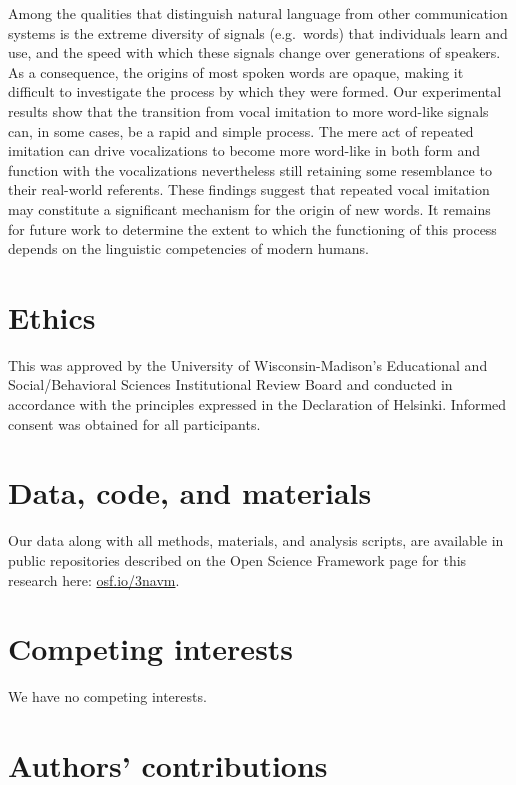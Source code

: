 \documentclass[english,floatsintext,man]{apa6}
\theoremstyle{definition}
\theoremstyle{definition}
\theoremstyle{definition}
\theoremstyle{remark}
\begin{document}
Among the qualities that distinguish natural language from other
communication systems is the extreme diversity of signals (e.g.~words)
that individuals learn and use, and the speed with which these signals
change over generations of speakers. As a consequence, the origins of
most spoken words are opaque, making it difficult to investigate the
process by which they were formed. Our experimental results show that
the transition from vocal imitation to more word-like signals can, in
some cases, be a rapid and simple process. The mere act of repeated
imitation can drive vocalizations to become more word-like in both form
and function with the vocalizations nevertheless still retaining some
resemblance to their real-world referents. These findings suggest that
repeated vocal imitation may constitute a significant mechanism for the
origin of new words. It remains for future work to determine the extent
to which the functioning of this process depends on the linguistic
competencies of modern humans.

\hypertarget{ethics}{%
\section{Ethics}\label{ethics}}

This was approved by the University of Wisconsin-Madison's Educational
and Social/Behavioral Sciences Institutional Review Board and conducted
in accordance with the principles expressed in the Declaration of
Helsinki. Informed consent was obtained for all participants.

\hypertarget{data-code-and-materials}{%
\section{Data, code, and materials}\label{data-code-and-materials}}

Our data along with all methods, materials, and analysis scripts, are
available in public repositories described on the Open Science Framework
page for this research here: \href{https://osf.io/3navm}{osf.io/3navm}.

\hypertarget{competing-interests}{%
\section{Competing interests}\label{competing-interests}}

We have no competing interests.

\hypertarget{authors-contributions}{%
\section{Authors' contributions}\label{authors-contributions}}
\end{document}
